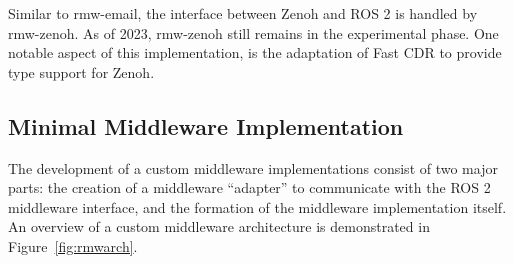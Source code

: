         Similar to \textsf{rmw-email}, the interface between Zenoh and \ac{ROS} 2 is handled by \textsf{rmw-zenoh}. As of 2023, \textsf{rmw-zenoh} still remains in the experimental phase. One notable aspect of this implementation, is the adaptation of Fast \ac{CDR} to provide type support for Zenoh.

    \subsection{Minimal Middleware Implementation}\label{ssec:minimal}

        The development of a custom middleware implementations consist of two major parts: the creation of a middleware ``adapter'' to communicate with the \ac{ROS} 2 middleware interface, and the formation of the middleware implementation itself. An overview of a custom middleware architecture is demonstrated in Figure~\ref{fig:rmwarch}. 

